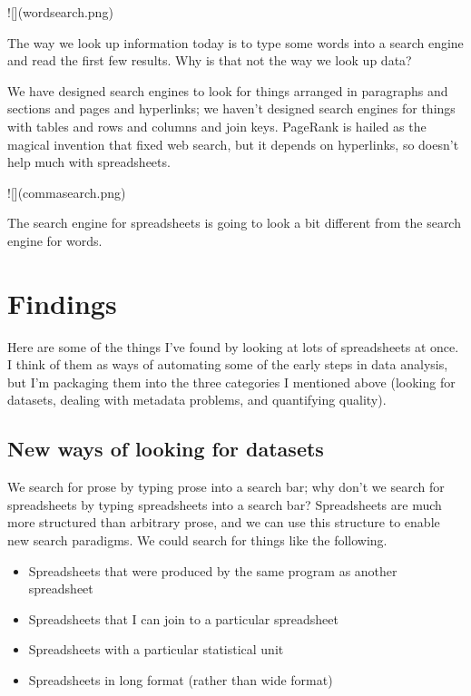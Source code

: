 \documentclass{acm_proc_article-sp}
\begin{document}
![](wordsearch.png)

The way we look up information today is to type some words into a search engine
and read the first few results. Why is that not the way we look up data?

We have designed search engines to look for things arranged in paragraphs
and sections and pages and hyperlinks; we haven't designed search engines for
things with tables and rows and columns and join keys.
PageRank is hailed as the magical invention that
fixed web search, but it depends on hyperlinks, so doesn't help much with spreadsheets.

![](commasearch.png)

The search engine for spreadsheets is going to look a bit different from
the search engine for words.















\section{Findings}
Here are some of the things I've found by looking at lots of spreadsheets at
once. I think of them as ways of automating some of the early steps in data
analysis, but I'm packaging them into the three categories I mentioned above
(looking for datasets, dealing with metadata problems, and quantifying quality).

\subsection{New ways of looking for datasets}
We search for prose by typing prose into a search bar; why don't
we search for spreadsheets by typing spreadsheets into a search bar?
Spreadsheets are much more structured than arbitrary prose, and we
can use this structure to enable new search paradigms. We could search
for things like the following.

\begin{itemize}
\item Spreadsheets that were produced by the same program as another spreadsheet
\item Spreadsheets that I can join to a particular spreadsheet
\item Spreadsheets with a particular statistical unit
\item Spreadsheets in long format (rather than wide format)
\end{itemize}
\end{document}
